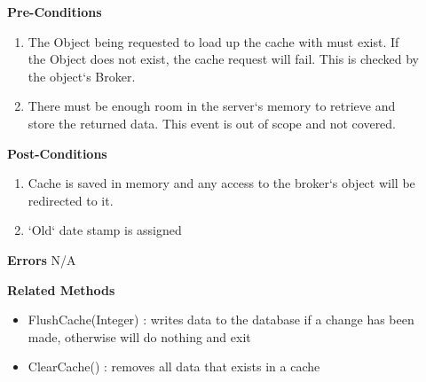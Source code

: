 \documentclass[letterpaper,12pt]{report}
\begin{document}
{\begin{description}
      \item[] \textbf{Pre-Conditions}
	  \begin{enumerate}
	   \item The Object being requested to load up the cache with must exist. If the Object does not exist, the cache request will fail. This is checked by the object`s Broker.
	   \item There must be enough room in the server`s memory to retrieve and store the returned data. This event is out of scope and not covered.
	  \end{enumerate}
      \item[] \textbf{Post-Conditions}
	  \begin{enumerate}
	   \item Cache is saved in memory and any access to the broker`s object will be redirected to it.
	   \item `Old` date stamp is assigned
	  \end{enumerate}
      \item[] \textbf{Errors}
	  \newline \hspace*{1cm} N/A
      \item[] \textbf{Related Methods}
	  \begin{itemize}
	   \item FlushCache(Integer) : writes data to the database if a change has been made, otherwise will do nothing and exit
	   \item ClearCache() : removes all data that exists in a cache
	  \end{itemize}

     \end{description}
}
\end{document}
